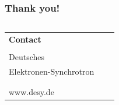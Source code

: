 \begin{frame}
\frametitle{Thank you!}
\vfill{}
\vspace*{3.5cm}


\fontsize{8}{9}\selectfont
\begin{columns}
	\hspace*{-0.8em}
	\hspace*{-1em}  %
	\begin{column}{\textwidth}
		\begin{tabular}{lll}
		\textbf{Contact}&\hspace*{0.5cm} & \\
						&\hspace*{0.5cm} & \\
		\hspace*{-0.4mm}\DESYWord{}Deutsches&\hspace*{0.5cm} & \AUTHOR \\
		Elektronen-Synchrotron &\hspace*{0.5cm} \\%
							&\hspace*{0.5cm} & \GROUP  \\
							&\hspace*{0.5cm} & \MailTo{\EMAIL}\\
		www.desy.de			%
		\end{tabular}
	\end{column}
\end{columns}

\end{frame}


